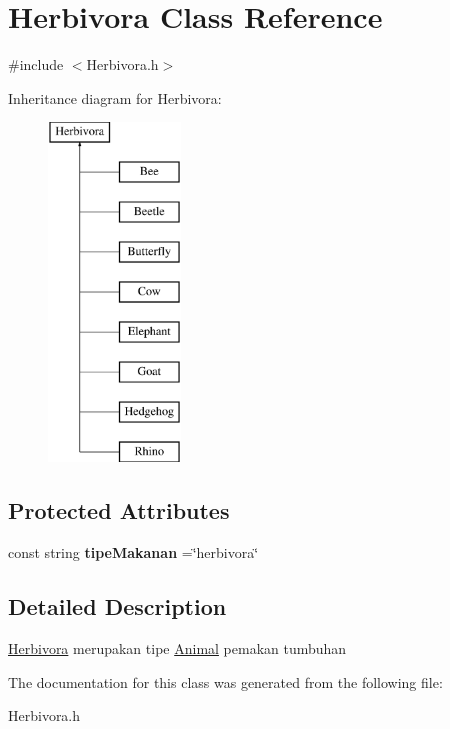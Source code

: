 \hypertarget{classHerbivora}{\section{Herbivora Class Reference}
\label{classHerbivora}
}


{\ttfamily \#include $<$Herbivora.\-h$>$}

Inheritance diagram for Herbivora\-:\begin{figure}[H]
\begin{center}
\leavevmode
\includegraphics[height=9.000000cm]{classHerbivora}
\end{center}
\end{figure}
\subsection*{Protected Attributes}
\begin{DoxyCompactItemize}
\item 
\hypertarget{classHerbivora_a821e0f6807a16249d4c1d00924aa1d2d}{const string {\bfseries tipe\-Makanan} =\char`\"{}herbivora\char`\"{}}\label{classHerbivora_a821e0f6807a16249d4c1d00924aa1d2d}

\end{DoxyCompactItemize}


\subsection{Detailed Description}
\hyperlink{classHerbivora}{Herbivora} merupakan tipe \hyperlink{classAnimal}{Animal} pemakan tumbuhan 

The documentation for this class was generated from the following file\-:\begin{DoxyCompactItemize}
\item 
Herbivora.\-h\end{DoxyCompactItemize}
